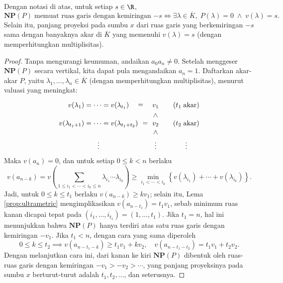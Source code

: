 \begin{theorem}\label{prop:Newton-polygon}
	Dengan notasi di atas, untuk setiap $s \in \R$,
	\[ \textbf{NP}(P)\; \text{memuat ruas garis dengan kemiringan $-s$} \iff \exists \lambda \in \overline{K}, \; P(\lambda)=0 \; \wedge \; v(\lambda)=s. \]
	Selain itu, panjang proyeksi pada sumbu $x$ dari ruas garis yang berkemiringan $-s$ sama dengan banyaknya akar di $\overline{K}$ yang memenuhi $v(\lambda)=s$ (dengan memperhitungkan multiplisitas).
\end{theorem}
\begin{proof}
	Tanpa mengurangi keumuman, andaikan $a_0 a_n \neq 0$. Setelah menggeser $\textbf{NP}(P)$ secara vertikal, kita dapat pula mengandaikan $a_n = 1$.	Daftarkan akar-akar $P$, yaitu $\lambda_1, \ldots, \lambda_n \in \overline{K}$ (dengan memperhitungkan multiplisitas), menurut valuasi yang meningkat:
	\[\begin{tikzcd}[column sep=small, row sep=small]
		v(\lambda_1) = \cdots = v(\lambda_{t_1}) \arrow[phantom, r, "=" description] & v_1 \arrow[sloped, phantom, d, "<" description] & (t_1 \;\text{akar}) \\
		v(\lambda_{t_1+1}) = \cdots = v(\lambda_{t_1 + t_2}) \arrow[phantom, r, "=" description] & v_2 \arrow[sloped, phantom, d, "<" description] & (t_2 \;\text{akar}) \\
		\vdots & \vdots & \vdots
	\end{tikzcd}\]
	Maka $v(a_n)=0$, dan untuk setiap $0 \leq k < n$ berlaku
	\[ v(a_{n-k}) = v\left( \sum_{1 \leq i_1 < \cdots < i_k \leq n} \lambda_{i_1} \cdots \lambda_{i_k} \right) \geq \min_{i_1 < \cdots < i_k}\left\{ v(\lambda_{i_1}) + \cdots + v(\lambda_{i_k}) \right\}. \]
	Jadi, untuk $0 \leq k \leq t_1$ berlaku $v(a_{n-k}) \geq k v_1$; selain itu, Lema \ref{prop:ultrametric} mengimplikasikan $v(a_{n-t_1}) = t_1 v_1$, sebab minimum ruas kanan dicapai tepat pada $(i_1, \ldots, i_{t_1}) = (1, \ldots, t_1)$. Jika $t_1=n$, hal ini menunjukkan bahwa $\textbf{NP}(P)$ hanya terdiri atas satu ruas garis dengan kemiringan $-v_1$. Jika $t_1 < n$, dengan cara yang sama diperoleh
	\[ 0 \leq k \leq t_2 \implies v(a_{n-t_1-k}) \geq t_1 v_1 + k v_2, \quad v(a_{n-t_1-t_2}) = t_1 v_1 + t_2 v_2. \]
	Dengan melanjutkan cara ini, dari kanan ke kiri $\textbf{NP}(P)$ dibentuk oleh ruas-ruas garis dengan kemiringan $-v_1 > -v_2 > \cdots$, yang panjang proyeksinya pada sumbu $x$ berturut-turut adalah $t_1, t_2, \ldots$, dan seterusnya.
\end{proof}

